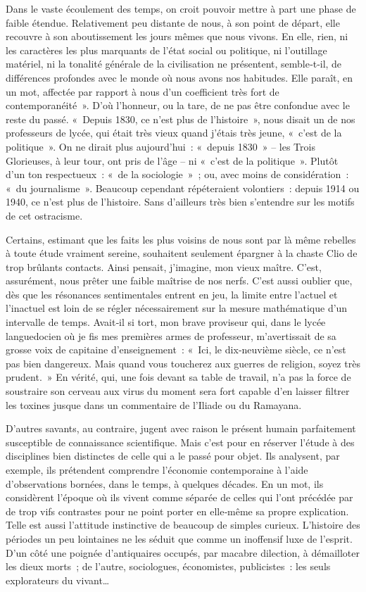 \documentclass[french,twoside]{book} %
\newcommand{\astermono}{\medskip\centerline{\color{rubric}\large\selectfont{\syms ✻}}\medskip\par}%
\begin{document}
\astermono

\noindent Dans le vaste écoulement des temps, on croit pouvoir mettre à part une phase de faible étendue. Relativement peu distante de nous, à son point de départ, elle recouvre à son aboutissement les jours mêmes que nous vivons. En elle, rien, ni les caractères les plus marquants de l’état social ou politique, ni l’outillage matériel, ni la tonalité générale de la civilisation ne présentent, semble‑t‑il, de différences profondes avec le monde où nous avons nos habitudes. Elle paraît, en un mot, affectée par rapport à nous d’un coefficient très fort de contemporanéité ». D’où l’honneur, ou la tare, de ne pas être confondue avec le reste du passé. « Depuis 1830, ce n’est plus de l’histoire », nous disait un de nos profes­seurs de lycée, qui était très vieux quand j’étais très jeune, « c’est de la politique ». On ne dirait plus aujourd’hui : « depuis 1830 » – les Trois Glorieuses, à leur tour, ont pris de l’âge – ni « c’est de la politique ». Plutôt d’un ton respectueux : « de la sociologie » ; ou, avec moins de considération : « du journalisme ». Beaucoup cependant répéteraient vo­lontiers : depuis 1914 ou 1940, ce n’est plus de l’histoire. Sans d’ailleurs très bien s’entendre sur les motifs de cet ostracisme.\par
Certains, estimant que les faits les plus voisins de nous sont par là même rebelles à toute étude vraiment sereine, souhaitent seulement épargner à la chaste Clio de trop brûlants contacts. Ainsi pensait, j’imagine, mon vieux maître. C’est, assurément, nous prêter une faible maîtrise de nos nerfs. C’est aussi oublier que, dès que les résonances sentimentales entrent en jeu, la limite entre l’actuel et l’inactuel est loin de se régler nécessairement sur la mesure mathématique d’un intervalle de temps. Avait‑il si tort, mon brave proviseur qui, dans le lycée languedocien où je fis mes premières armes de professeur, m’avertissait de sa grosse voix de capitaine d’enseignement : « Ici, le dix‑neuvième siècle, ce n’est pas bien dangereux. Mais quand vous toucherez aux guerres de religion, soyez très prudent. » En vérité, qui, une fois devant sa table de travail, n’a pas la force de soustraire son cerveau aux virus du moment sera fort capable d’en laisser filtrer les toxines jusque dans un commentaire de l’Iliade ou du Ramayana.\par
D’autres savants, au contraire, jugent avec raison le présent humain parfaitement susceptible de connaissance scientifique. Mais c’est pour en réserver l’étude à des disciplines bien distinctes de celle qui a le passé pour objet. Ils analysent, par exemple, ils prétendent comprendre l’éco­nomie contemporaine à l’aide d’observations bornées, dans le temps, à quelques décades. En un mot, ils considèrent l’époque où ils vivent comme  
\label{p11} séparée de celles qui l’ont précédée par de trop vifs contrastes pour ne point porter en elle‑même sa propre explication. Telle est aussi l’attitude instinctive de beaucoup de simples curieux. L’histoire des périodes un peu lointaines ne les séduit que comme un inoffensif luxe de l’esprit. D’un côté une poignée d’antiquaires occupés, par macabre dilection, à démailloter les dieux morts ; de l’autre, sociologues, économistes, publi­cistes : les seuls explorateurs du vivant…
\end{document}
